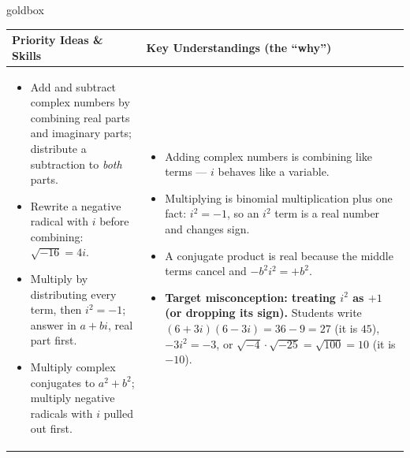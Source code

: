 \documentclass[10pt]{article}
\begin{document}
\renewcommand{\arraystretch}{1.4}
\begin{skillbox}{goldbox}
\begin{tabularx}{\linewidth}{@{}X|X@{}}
\textbf{Priority Ideas \& Skills} & \textbf{Key Understandings (the ``why'')} \\[2pt]
\hline
\vspace{-6pt}
\begin{itemize}[leftmargin=1.1em, nosep, after=\vspace{2pt}]
  \item Add and subtract complex numbers by combining real parts and imaginary parts; distribute
        a subtraction to \emph{both} parts.
  \item Rewrite a negative radical with $i$ before combining: $\sqrt{-16}=4i$.
  \item Multiply by distributing every term, then $i^2=-1$; answer in $a+bi$, real part first.
  \item Multiply complex conjugates to $a^2+b^2$; multiply negative radicals with $i$ pulled out
        first.
\end{itemize}
&
\vspace{-6pt}
\begin{itemize}[leftmargin=1.1em, nosep, after=\vspace{2pt}]
  \item Adding complex numbers is combining like terms --- $i$ behaves like a variable.
  \item Multiplying is binomial multiplication plus one fact: $i^2=-1$, so an $i^2$ term is a
        real number and changes sign.
  \item A conjugate product is real because the middle terms cancel and $-b^2i^2=+b^2$.
  \item \textbf{Target misconception: treating $i^2$ as $+1$ (or dropping its sign).} Students
        write $(6+3i)(6-3i)=36-9=27$ (it is $45$), $-3i^2=-3$, or
        $\sqrt{-4}\cdot\sqrt{-25}=\sqrt{100}=10$ (it is $-10$).
\end{itemize}
\end{tabularx}
\end{skillbox}
\end{document}
